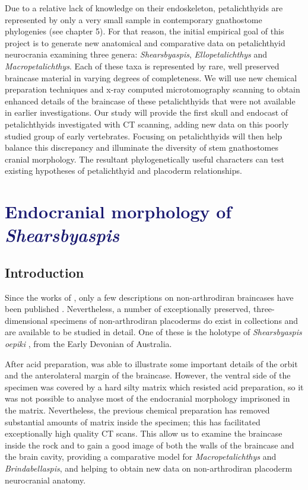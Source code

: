 \documentclass[11pt,letterpaper]{report}
\begin{document}
Due to a relative lack of knowledge on their endoskeleton, petalichthyids are represented by only a very small sample in contemporary gnathostome phylogenies \citep{brazeau2009braincase,davis2012,zhu2013silurian,Dupret2014,giles2015osteichthyan} (see chapter 5). For that reason, the initial empirical goal of this project is to generate new anatomical and comparative data on petalichthyid neurocrania examining three genera: \textit{Shearsbyaspis}, \textit{Ellopetalichthys} and \textit{Macropetalichthys}. Each of these taxa is represented by rare, well preserved braincase material in varying degrees of completeness. We will use new chemical preparation techniques and x-ray computed microtomography scanning to obtain enhanced details of the braincase of these petalichthyids that were not available in earlier investigations. Our study will provide the first skull and endocast of petalichthyids investigated with CT scanning, adding new data on this poorly studied group of early vertebrates. Focusing on petalichthyids will then help balance this discrepancy and illuminate the diversity of stem gnathostomes cranial morphology. The resultant phylogenetically useful characters can test existing hypotheses of petalichthyid and placoderm relationships.


\newpage
\chapter{\LARGE{\textcolor{MidnightBlue}{Endocranial morphology of \textit{Shearsbyaspis}}}}
\smallskip
\section{Introduction}
Since the works of \cite{Stensi1925,Stensi1950,Stensi1963b,Stensi1969}, only a few descriptions on non-arthrodiran braincases have been published \citep{Ørvig1957,Gross1959,Young1978,Young1980,Goujet1985,lelievre1995,Long1997,Trinajstic2012}. Nevertheless, a number of exceptionally preserved, three-dimensional specimens of non-arthrodiran placoderms do exist in collections and are available to be studied in detail. One of these is the holotype of \textit{Shearsbyaspis oepiki} \citealt{Young1985}, from the Early Devonian of Australia. 

After acid preparation, \cite{Young1985} was able to illustrate some important details of the orbit and the anterolateral margin of the braincase. However, the ventral side of the specimen was covered by a hard silty matrix which resisted acid preparation, so it was not possible to analyse most of the endocranial morphology imprisoned in the matrix. Nevertheless, the previous chemical preparation has removed substantial amounts of matrix inside the specimen; this has facilitated exceptionally high quality CT scans. This allow us to examine the braincase inside the rock and to gain a good image of both the walls of the braincase and the brain cavity, providing a comparative model for \textit{Macropetalichthys} and \textit{Brindabellaspis}, and helping to obtain new data on non-arthrodiran placoderm neurocranial anatomy.
\end{document}
